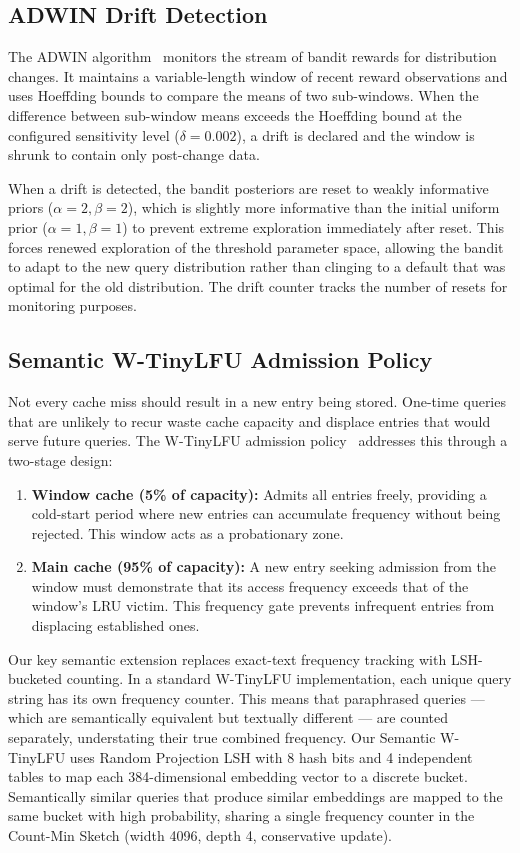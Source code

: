 \documentclass[conference]{IEEEtran}
\begin{document}
\subsection{ADWIN Drift Detection}

The ADWIN algorithm~\cite{bifet2007} monitors the stream of bandit rewards for distribution changes. It maintains a variable-length window of recent reward observations and uses Hoeffding bounds to compare the means of two sub-windows. When the difference between sub-window means exceeds the Hoeffding bound at the configured sensitivity level ($\delta = 0.002$), a drift is declared and the window is shrunk to contain only post-change data.

When a drift is detected, the bandit posteriors are reset to weakly informative priors ($\alpha = 2, \beta = 2$), which is slightly more informative than the initial uniform prior ($\alpha = 1, \beta = 1$) to prevent extreme exploration immediately after reset. This forces renewed exploration of the threshold parameter space, allowing the bandit to adapt to the new query distribution rather than clinging to a default that was optimal for the old distribution. The drift counter tracks the number of resets for monitoring purposes.

\subsection{Semantic W-TinyLFU Admission Policy}

Not every cache miss should result in a new entry being stored. One-time queries that are unlikely to recur waste cache capacity and displace entries that would serve future queries. The W-TinyLFU admission policy~\cite{einziger2017} addresses this through a two-stage design:

\begin{enumerate}[leftmargin=*]
\item \textbf{Window cache (5\% of capacity):} Admits all entries freely, providing a cold-start period where new entries can accumulate frequency without being rejected. This window acts as a probationary zone.
\item \textbf{Main cache (95\% of capacity):} A new entry seeking admission from the window must demonstrate that its access frequency exceeds that of the window's LRU victim. This frequency gate prevents infrequent entries from displacing established ones.
\end{enumerate}

Our key semantic extension replaces exact-text frequency tracking with LSH-bucketed counting. In a standard W-TinyLFU implementation, each unique query string has its own frequency counter. This means that paraphrased queries --- which are semantically equivalent but textually different --- are counted separately, understating their true combined frequency. Our Semantic W-TinyLFU uses Random Projection LSH with 8 hash bits and 4 independent tables to map each 384-dimensional embedding vector to a discrete bucket. Semantically similar queries that produce similar embeddings are mapped to the same bucket with high probability, sharing a single frequency counter in the Count-Min Sketch (width 4096, depth 4, conservative update).
\end{document}
